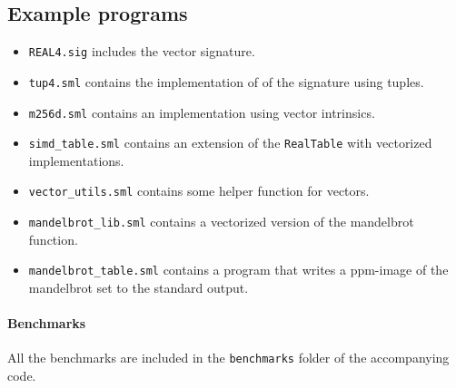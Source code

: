 \documentclass{article}
\begin{document}
\subsection{Example programs}

\begin{itemize}

\item \verb!REAL4.sig! includes the vector signature.

\item \verb!tup4.sml! contains the implementation of of the signature using tuples.

\item \verb!m256d.sml! contains an implementation using vector intrinsics.

\item \verb!simd_table.sml! contains an extension of the \verb!RealTable! with vectorized implementations.

\item \verb!vector_utils.sml! contains some helper function for vectors.

\item \verb!mandelbrot_lib.sml! contains a vectorized version of the mandelbrot function.

\item \verb!mandelbrot_table.sml! contains a program that writes a ppm-image of the mandelbrot set to the standard output.
\end{itemize}

\paragraph{Benchmarks}
All the benchmarks are included in the \verb!benchmarks! folder of the accompanying code.
\end{document}
